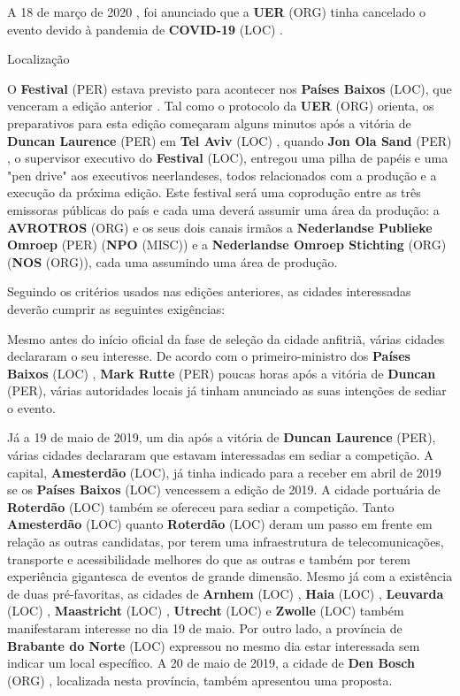 \documentclass[12pt,a4paper]{article}
\begin{document}
A 18 de março de 2020 , foi anunciado que a \textbf{UER} (ORG) tinha cancelado o evento devido à pandemia de \textbf{COVID-19} (LOC) .



Localização

O \textbf{Festival} (PER) estava previsto para acontecer nos \textbf{Países Baixos} (LOC), que venceram a edição anterior . Tal como o protocolo da \textbf{UER} (ORG) orienta, os preparativos para esta edição começaram alguns minutos após a vitória de \textbf{Duncan Laurence} (PER) em \textbf{Tel Aviv} (LOC) , quando \textbf{Jon Ola Sand} (PER) , o supervisor executivo do \textbf{Festival} (LOC), entregou uma pilha de papéis e uma "pen drive" aos executivos neerlandeses, todos relacionados com a produção e a execução da próxima edição. Este festival será uma coprodução entre as três emissoras públicas do país e cada uma deverá assumir uma área da produção: a \textbf{AVROTROS} (ORG) e os seus dois canais irmãos a \textbf{Nederlandse Publieke Omroep} (PER) (\textbf{NPO} (MISC)) e a \textbf{Nederlandse Omroep Stichting} (ORG) (\textbf{NOS} (ORG)), cada uma assumindo uma área de produção.

Seguindo os critérios usados nas edições anteriores, as cidades interessadas deverão cumprir as seguintes exigências:

Mesmo antes do início oficial da fase de seleção da cidade anfitriã, várias cidades declararam o seu interesse. De acordo com o primeiro-ministro dos \textbf{Países Baixos} (LOC) , \textbf{Mark Rutte} (PER) poucas horas após a vitória de \textbf{Duncan} (PER), várias autoridades locais já tinham anunciado as suas intenções de sediar o evento.

Já a 19 de maio de 2019, um dia após a vitória de \textbf{Duncan Laurence} (PER), várias cidades declararam que estavam interessadas em sediar a competição. A capital, \textbf{Amesterdão} (LOC), já tinha indicado para a receber em abril de 2019 se os \textbf{Países Baixos} (LOC) vencessem a edição de 2019. A cidade portuária de \textbf{Roterdão} (LOC) também se ofereceu para sediar a competição. Tanto \textbf{Amesterdão} (LOC) quanto \textbf{Roterdão} (LOC) deram um passo em frente em relação as outras candidatas, por terem uma infraestrutura de telecomunicações, transporte e acessibilidade melhores do que as outras e também por terem experiência gigantesca de eventos de grande dimensão. Mesmo já com a existência de duas pré-favoritas, as cidades de \textbf{Arnhem} (LOC) , \textbf{Haia} (LOC) , \textbf{Leuvarda} (LOC) , \textbf{Maastricht} (LOC) , \textbf{Utrecht} (LOC) e \textbf{Zwolle} (LOC) também manifestaram interesse no dia 19 de maio. Por outro lado, a província de \textbf{Brabante do Norte} (LOC) expressou no mesmo dia estar interessada sem indicar um local específico. A 20 de maio de 2019, a cidade de \textbf{Den Bosch} (ORG) , localizada nesta província, também apresentou uma proposta.
\end{document}
